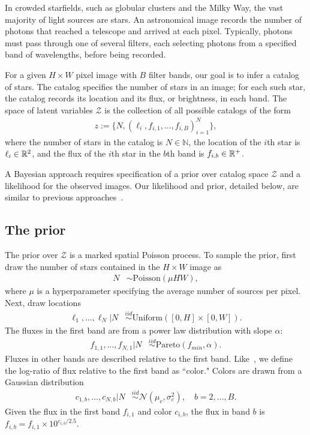 In crowded starfields, such as globular clusters and the Milky Way, the vast majority of light sources are stars.
An astronomical image records the number of photons that reached a telescope and arrived at each pixel. 
Typically, photons must pass through one of several filters, each selecting photons from a specified band of wavelengths, before being recorded.

For a given $H \times W$ pixel image with $B$ filter bands, our goal is to infer a catalog of 
stars. 
The catalog specifies the number of stars 
in an image; for each such star, the catalog 
records its location and its flux, or brightness,
in each band. 
The space of latent variables 
$\mathcal{Z}$ is the collection of all possible catalogs of the form
\begin{align}
    z := \{N, (\ell_i, f_{i,1}, ..., f_{i,B})_{i = 1}^N\},
    \label{eq:cat_formulation}
\end{align}
where the number of stars in the catalog
is $N\in\mathbb{N}$,
the location of the $i$th star is $\ell_i \in \mathbb{R}^2$, and 
the flux of the $i$th star in the $b$th band is $f_{i, b}\in\mathbb{R}^+$. 

A Bayesian approach requires specification of a prior over catalog space $\mathcal{Z}$ and a likelihood for the observed images. Our likelihood and prior, detailed below, are similar to previous approaches~\cite{Portillo_2017, Brewer_2013, Feder_2019, regier2019_celeste}.

\subsection{The prior}
The prior over $\mathcal{Z}$ is a marked spatial Poisson process. To sample the prior, first draw the number of stars contained in the $H\times W$ image as
\begin{align}
	N &\sim \text{Poisson}(\mu HW),
	\label{eq:n_prior}
\end{align}
where $\mu$ is a hyperparameter specifying the average number of sources per pixel.
Next, draw locations
\begin{align}
  \ell_1, ..., \ell_N | N &\stackrel{iid}{\sim} \text{Uniform}([0, H] \times [0, W]). 
 \end{align}
The fluxes in the first band are from a power law distribution with slope $\alpha$:
\begin{align}
    f_{1, 1}, ..., f_{N,1} | N & 
    \stackrel{iid}{\sim} \text{Pareto}(f_{min}, \alpha) 
    \label{eq:flux_prior}.
\end{align}
Fluxes in other bands are described relative to the first band. Like~\cite{Feder_2019}, we define the log-ratio of flux relative to the first band as ``color." Colors are drawn from a Gaussian distribution
\begin{align}
  c_{1, b}, ..., c_{N,b} | N  & 
      \stackrel{iid}{\sim} \mathcal{N}(\mu_c, \sigma^2_c), \quad b = 2, ..., B.
\end{align}
Given the flux in the first band $f_{i,1}$ and color $c_{i,b}$,
the flux in band $b$ is  $f_{i,b} = f_{i,1} \times 10^{c_{i,b} / 2.5}$.

